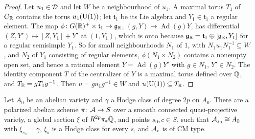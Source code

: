 \begin{proof}
Let $u_{1}\in\mathcal{D}$ and let $W$ be a neighbourhood of $u_{1}$. A maximal torus
$T_{1}$ of $G_{\mathbb{R}}$ contains the torus $u_{1}(\operatorname{U}(1))$; let
$\mathfrak{t}_{1}$ be its Lie algebra and $Y_{1}\in\mathfrak{t}_{1}$ a regular
element. The map $\phi\colon G(\mathbb{R})^{+}\times\mathfrak{t}_{1}\to
\mathfrak{g}_{\mathbb{R}}$, $(g,Y)\mapsto\operatorname{Ad}(g)Y$, has differential
$(Z,Y')\mapsto[Z,Y_{1}]+Y'$ at $(1,Y_{1})$, which is onto because
$\mathfrak{g}_{\mathbb{R}}=\mathfrak{t}_{1}\oplus[\mathfrak{g}_{\mathbb{R}},Y_{1}]$ for a
regular semisimple $Y_{1}$. So for small neighbourhoods $N_{1}$ of $1$, with
$N_{1}u_{1}N_{1}^{-1}\subseteq W$, and $N_{2}$ of $Y_{1}$ consisting of
regular elements, $\phi(N_{1}\times N_{2})$ contains a nonempty open set,
and hence a rational element $Y=\operatorname{Ad}(g)Y'$ with $g\in N_{1}$,
$Y'\in N_{2}$. The identity component $T$ of the centralizer of $Y$ is a
maximal torus defined over $\mathbb{Q}$, and $T_{\mathbb{R}}=gT_{1}g^{-1}$. Then
$u=gu_{1}g^{-1}\in W$ and $u(\operatorname{U}(1))\subseteq T_{\mathbb{R}}$.
\end{proof}

\begin{proposition}\label{prop:cmfamily}
Let $A_{0}$ be an abelian variety and $\gamma$ a Hodge class of degree $2p$
on $A_{0}$. There are a polarized abelian scheme $\pi\colon\mathcal{A}\to S$ over a
smooth connected quasi-projective variety, a global section $\xi$ of
$R^{2p}\pi_{*}\mathbb{Q}$, and points $s_{0},c\in S$, such that
$\mathcal{A}_{s_{0}}\cong A_{0}$ with $\xi_{s_{0}}=\gamma$, $\xi_{s}$ is a Hodge class
for every $s$, and $\mathcal{A}_{c}$ is of CM type.
\end{proposition}

